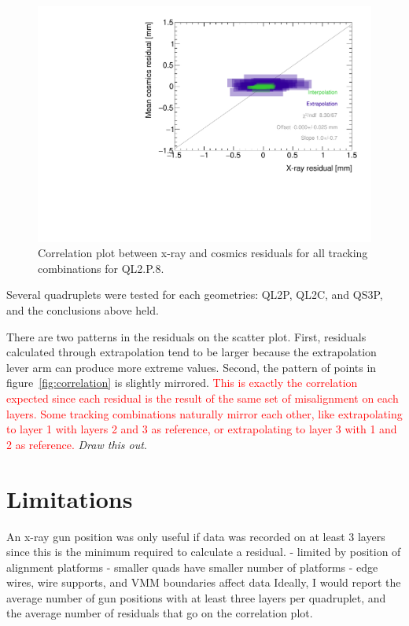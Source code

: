 \begin{figure}
    \centering
    \includegraphics[width = \textwidth]{figures/figure_QL2P08_3100V_2021-08-16_QL2P08_local_cosmic_and_xray_data_correlation_plot.pdf}
    \caption{Correlation plot between x-ray and cosmics residuals for all tracking combinations for QL2.P.8.}
    \label{fig:no_correlation}
\end{figure}

Several quadruplets were tested for each geometries: QL2P, QL2C, and QS3P, and the conclusions above held. 

There are two patterns in the residuals on the scatter plot. First, residuals calculated through extrapolation tend to be larger because the extrapolation lever arm can produce more extreme values. Second, the pattern of points in figure~\ref{fig:correlation} is slightly mirrored. \textcolor{red}{This is exactly the correlation expected since each residual is the result of the same set of misalignment on each layers. Some tracking combinations naturally mirror each other, like extrapolating to layer 1 with layers 2 and 3 as reference, or extrapolating to layer 3 with 1 and 2 as reference.} \textit{Draw this out}.


\section{Limitations}
An x-ray gun position was only useful if data was recorded on at least 3 layers since this is the minimum required to calculate a residual. 
- limited by position of alignment platforms
- smaller quads have smaller number of platforms
- edge wires, wire supports, and VMM boundaries affect data
Ideally, I would report the average number of gun positions with at least three layers per quadruplet, and the average number of residuals that go on the correlation plot.

